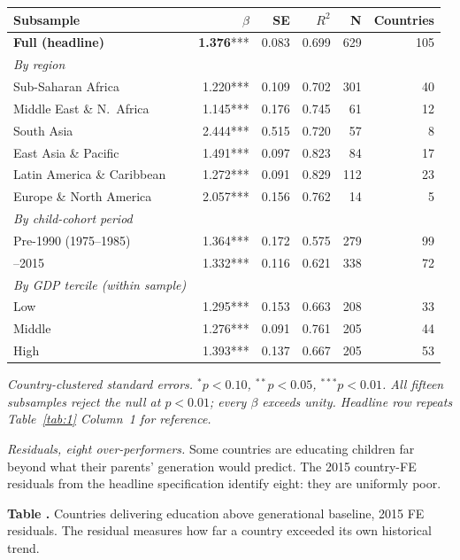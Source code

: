 \documentclass[12pt,letterpaper]{article}
\begin{document}
\begin{longtable}[]{@{}lrrrrr@{}}
\toprule
Subsample & $\beta$ & SE & $R^2$ & N & Countries \\
\midrule
\endhead
\textbf{Full (headline)}         & \textbf{1.376}*** & 0.083 & 0.699 & 629 & 105 \\
\addlinespace
\emph{By region} & & & & & \\
\quad Sub-Saharan Africa         & 1.220*** & 0.109 & 0.702 & 301 &  40 \\
\quad Middle East \& N.~Africa   & 1.145*** & 0.176 & 0.745 &  61 &  12 \\
\quad South Asia                 & 2.444*** & 0.515 & 0.720 &  57 &   8 \\
\quad East Asia \& Pacific       & 1.491*** & 0.097 & 0.823 &  84 &  17 \\
\quad Latin America \& Caribbean & 1.272*** & 0.091 & 0.829 & 112 &  23 \\
\quad Europe \& North America    & 2.057*** & 0.156 & 0.762 &  14 &   5 \\
\addlinespace
\emph{By child-cohort period} & & & & & \\
\quad Pre-1990 (1975--1985)      & 1.364*** & 0.172 & 0.575 & 279 &  99 \\
\quad 1990--2015                 & 1.332*** & 0.116 & 0.621 & 338 &  72 \\
\addlinespace
\emph{By GDP tercile (within sample)} & & & & & \\
\quad Low                        & 1.295*** & 0.153 & 0.663 & 208 &  33 \\
\quad Middle                     & 1.276*** & 0.091 & 0.761 & 205 &  44 \\
\quad High                       & 1.393*** & 0.137 & 0.667 & 205 &  53 \\
\bottomrule
\end{longtable}

\emph{Country-clustered standard errors. $^{*}\!p<0.10$,
$^{**}\!p<0.05$, $^{***}\!p<0.01$. All fifteen subsamples reject the
null at $p<0.01$; every $\beta$ exceeds unity. Headline row repeats
Table~\ref{tab:1} Column~1 for reference.}

\emph{Residuals, eight over-performers.} Some countries are educating
children far beyond what their parents' generation would predict. The
2015 country-FE residuals from the headline specification identify
eight: they are uniformly poor.

\label{tab:4}\textbf{Table \thetable.} Countries delivering education above generational
baseline, 2015 FE residuals. The residual measures how far a country
exceeded its own historical trend.
\end{document}
